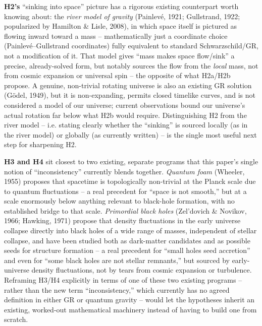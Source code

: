 \documentclass[12pt, a4paper]{article}
\begin{document}
\textbf{H2's} ``sinking into space'' picture has a rigorous existing
counterpart worth knowing about: the \emph{river model of gravity}
(Painlev\'e, 1921; Gullstrand, 1922; popularized by Hamilton \& Lisle,
2008), in which space itself is pictured as flowing inward toward a
mass -- mathematically just a coordinate choice (Painlev\'e--Gullstrand
coordinates) fully equivalent to standard Schwarzschild/GR, not a
modification of it. That model gives ``mass makes space flow/sink''
a precise, already-solved form, but notably sources the flow from the
\emph{local} mass, not from cosmic expansion or universal spin -- the
opposite of what H2a/H2b propose. A genuine, non-trivial rotating
universe is also an existing GR solution (G\"odel, 1949), but it is
non-expanding, permits closed timelike curves, and is not considered a
model of our universe; current observations bound our universe's
actual rotation far below what H2b would require. Distinguishing
H2 from the river model -- i.e. stating clearly whether the ``sinking''
is sourced locally (as in the river model) or globally (as currently
written) -- is the single most useful next step for sharpening H2.

\textbf{H3 and H4} sit closest to two existing, separate programs that
this paper's single notion of ``inconsistency'' currently blends
together. \emph{Quantum foam} (Wheeler, 1955) proposes that spacetime
is topologically non-trivial at the Planck scale due to quantum
fluctuations -- a real precedent for ``space is not smooth,'' but at a
scale enormously below anything relevant to black-hole formation, with
no established bridge to that scale. \emph{Primordial black holes}
(Zel'dovich \& Novikov, 1966; Hawking, 1971) propose that density
fluctuations in the early universe collapse directly into black holes
of a wide range of masses, independent of stellar collapse, and have
been studied both as dark-matter candidates and as possible seeds for
structure formation -- a real precedent for ``small holes seed
accretion'' and even for ``some black holes are not stellar remnants,''
but sourced by early-universe density fluctuations, not by tears from
cosmic expansion or turbulence. Reframing H3/H4 explicitly in terms of
one of these two existing programs -- rather than the new term
``inconsistency,'' which currently has no agreed definition in either
GR or quantum gravity -- would let the hypotheses inherit an existing,
worked-out mathematical machinery instead of having to build one from
scratch.
\end{document}

